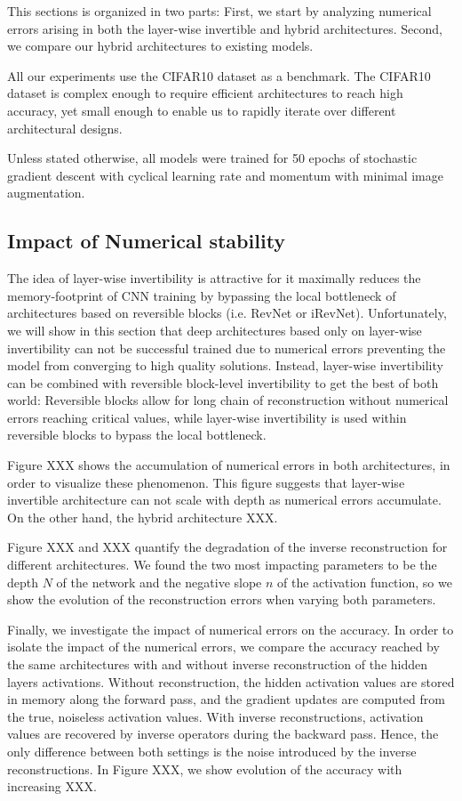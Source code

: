 \documentclass[twocolumn]{bmcart}
\begin{document}
This sections is organized in two parts:
First, we start by analyzing numerical errors arising in both the layer-wise invertible and hybrid architectures.
Second, we compare our hybrid architectures to existing models.

All our experiments use the CIFAR10 dataset as a benchmark.
The CIFAR10 dataset is complex enough to require efficient architectures to reach high accuracy,
yet small enough to enable us to rapidly iterate over different architectural designs.

Unless stated otherwise, all models were trained for 50 epochs of stochastic gradient descent with cyclical learning rate
and momentum \cite{smith2017super} with minimal image augmentation.

\subsection{Impact of Numerical stability}

The idea of layer-wise invertibility is attractive for it maximally reduces the memory-footprint of CNN training
by bypassing the local bottleneck of architectures based on reversible blocks (i.e. RevNet or iRevNet).
Unfortunately, we will show in this section that deep architectures based only on layer-wise invertibility
can not be successful trained due to numerical errors preventing the model from converging to high quality solutions.
Instead, layer-wise invertibility can be combined with reversible block-level invertibility to get the best of both world:
Reversible blocks allow for long chain of reconstruction without numerical errors reaching critical values,
while layer-wise invertibility is used within reversible blocks to bypass the local bottleneck.

Figure XXX shows the accumulation of numerical errors in both architectures, in order to visualize these phenomenon.
This figure suggests that layer-wise invertible architecture can not scale with depth as numerical errors accumulate.
On the other hand, the hybrid architecture XXX.

Figure XXX and XXX quantify the degradation of the inverse reconstruction for different architectures.
We found the two most impacting parameters to be the depth $N$ of the network and the negative slope $n$ of the activation function,
so we show the evolution of the reconstruction errors when varying both parameters.

Finally, we investigate the impact of numerical errors on the accuracy.
In order to isolate the impact of the numerical errors,
we compare the accuracy reached by the same architectures with and without inverse reconstruction of the hidden layers activations.
Without reconstruction, the hidden activation values are stored in memory along the forward pass,
and the gradient updates are computed from the true, noiseless activation values.
With inverse reconstructions, activation values are recovered by inverse operators during the backward pass.
Hence, the only difference between both settings is the noise introduced by the inverse reconstructions.
In Figure XXX, we show evolution of the accuracy with increasing XXX.
\end{document}
